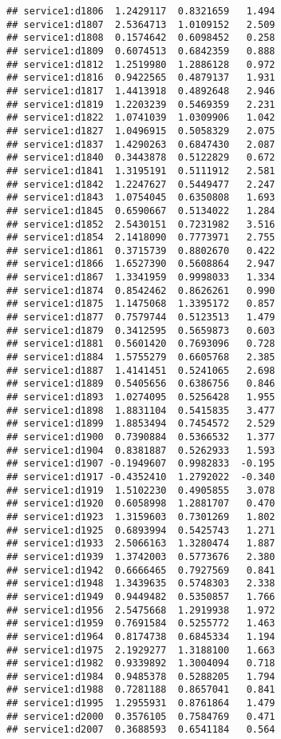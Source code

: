 \documentclass[
]{article}
\begin{document}
\begin{verbatim}
## service1:d1806  1.2429117  0.8321659   1.494
## service1:d1807  2.5364713  1.0109152   2.509
## service1:d1808  0.1574642  0.6098452   0.258
## service1:d1809  0.6074513  0.6842359   0.888
## service1:d1812  1.2519980  1.2886128   0.972
## service1:d1816  0.9422565  0.4879137   1.931
## service1:d1817  1.4413918  0.4892648   2.946
## service1:d1819  1.2203239  0.5469359   2.231
## service1:d1822  1.0741039  1.0309906   1.042
## service1:d1827  1.0496915  0.5058329   2.075
## service1:d1837  1.4290263  0.6847430   2.087
## service1:d1840  0.3443878  0.5122829   0.672
## service1:d1841  1.3195191  0.5111912   2.581
## service1:d1842  1.2247627  0.5449477   2.247
## service1:d1843  1.0754045  0.6350808   1.693
## service1:d1845  0.6590667  0.5134022   1.284
## service1:d1852  2.5430151  0.7231982   3.516
## service1:d1854  2.1418090  0.7773971   2.755
## service1:d1861  0.3715739  0.8802670   0.422
## service1:d1866  1.6527390  0.5608864   2.947
## service1:d1867  1.3341959  0.9998033   1.334
## service1:d1874  0.8542462  0.8626261   0.990
## service1:d1875  1.1475068  1.3395172   0.857
## service1:d1877  0.7579744  0.5123513   1.479
## service1:d1879  0.3412595  0.5659873   0.603
## service1:d1881  0.5601420  0.7693096   0.728
## service1:d1884  1.5755279  0.6605768   2.385
## service1:d1887  1.4141451  0.5241065   2.698
## service1:d1889  0.5405656  0.6386756   0.846
## service1:d1893  1.0274095  0.5256428   1.955
## service1:d1898  1.8831104  0.5415835   3.477
## service1:d1899  1.8853494  0.7454572   2.529
## service1:d1900  0.7390884  0.5366532   1.377
## service1:d1904  0.8381887  0.5262933   1.593
## service1:d1907 -0.1949607  0.9982833  -0.195
## service1:d1917 -0.4352410  1.2792022  -0.340
## service1:d1919  1.5102230  0.4905855   3.078
## service1:d1920  0.6058998  1.2881707   0.470
## service1:d1923  1.3159603  0.7301269   1.802
## service1:d1925  0.6893994  0.5425743   1.271
## service1:d1933  2.5066163  1.3280474   1.887
## service1:d1939  1.3742003  0.5773676   2.380
## service1:d1942  0.6666465  0.7927569   0.841
## service1:d1948  1.3439635  0.5748303   2.338
## service1:d1949  0.9449482  0.5350857   1.766
## service1:d1956  2.5475668  1.2919938   1.972
## service1:d1959  0.7691584  0.5255772   1.463
## service1:d1964  0.8174738  0.6845334   1.194
## service1:d1975  2.1929277  1.3188100   1.663
## service1:d1982  0.9339892  1.3004094   0.718
## service1:d1984  0.9485378  0.5288205   1.794
## service1:d1988  0.7281188  0.8657041   0.841
## service1:d1995  1.2955931  0.8761864   1.479
## service1:d2000  0.3576105  0.7584769   0.471
## service1:d2007  0.3688593  0.6541184   0.564

\end{verbatim}
\end{document}
